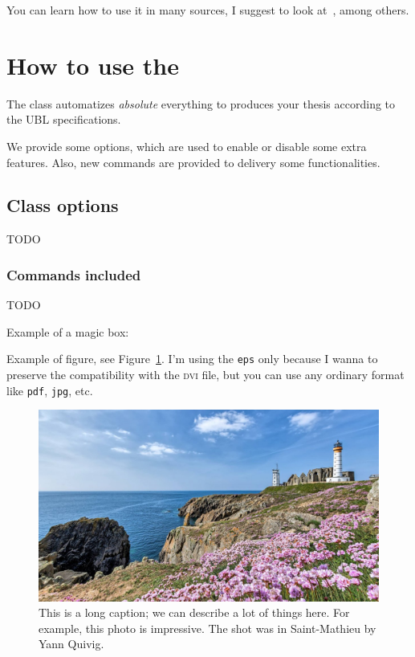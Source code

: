 You can learn how to use it in many sources, I suggest to look at~\cite{lamport1994latex}, among others.


\section{How to use the \texorpdfstring{\ublmstic}{UBL-\textsc{mathstic}}}\label{sec-howtoubl}
The \ublmstic{} class automatizes \emph{absolute} everything to produces your thesis according to the UBL specifications.

We provide some options, which are used to enable or disable some extra features.
Also, new commands are provided to delivery some functionalities.

\subsection{Class options}
 TODO
 
\subsubsection{Commands included}
TODO


Example of a magic box:
\Blindtext%

Example of figure, see Figure~\ref{fig:test}. I'm using the \texttt{eps} only because   I wanna to preserve the compatibility with the \textsc{dvi} file, but you can use any ordinary format like \texttt{pdf}, \texttt{jpg}, etc.

\begin{figure}[tbh]
	\centering
	\includegraphics[width=0.7\linewidth]{Figures/saint_mathieu_avec_les_armeries_yann_quiviger-3215501}%
	\caption[Short caption goes to List of Figures]{This is a long caption; we can describe a lot of things here. For example, this photo is impressive. The shot was in Saint-Mathieu by Yann Quivig.}%
	\label{fig:test}
\end{figure}


